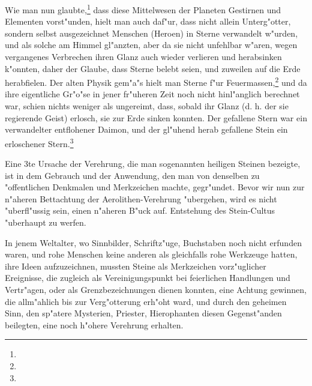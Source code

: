 \documentclass[a4paper, 11pt, oneside, polutonikogreek, german]{article}
\begin{document}
Wie man nun glaubte,\footnote{} dass diese Mittelwesen der Planeten Gestirnen und Elementen vorst"unden, hielt man auch daf"ur, dass nicht allein Unterg"otter, sondern selbst ausgezeichnet Menschen (Heroen) in Sterne verwandelt w"urden, und als solche am Himmel gl"anzten, aber da sie nicht unfehlbar w"aren, wegen vergangenes Verbrechen ihren Glanz auch wieder verlieren und herabsinken k"onnten, daher der Glaube, dass Sterne belebt seien, und zuweilen auf die Erde herabfielen. Der alten Physik gem"a"s hielt man Sterne f"ur Feuermassen,\footnote{} und da ihre eigentliche Gr"o"se in jener fr"uheren Zeit noch nicht hinl"anglich berechnet war, schien nichts weniger als ungereimt, dass, sobald ihr Glanz (d. h. der sie regierende Geist) erlosch, sie zur Erde sinken konnten. Der gefallene Stern war ein verwandelter entflohener Daimon, und der gl"uhend herab gefallene Stein ein erloschener Stern.\footnote{}

Eine 3te Ursache der Verehrung, die man sogenannten heiligen Steinen bezeigte, ist in dem Gebrauch und der Anwendung, den man von denselben zu "offentlichen Denkmalen und Merkzeichen machte, gegr"undet. Bevor wir nun zur n"aheren Bettachtung der Aerolithen-Verehrung "ubergehen, wird es nicht "uberfl"ussig sein, einen n"aheren B"uck auf. Entstehung des Stein-Cultus "uberhaupt zu werfen.

In jenem Weltalter, wo Sinnbilder, Schriftz"uge, Buchstaben noch nicht erfunden waren, und rohe Menschen keine anderen als gleichfalls rohe Werkzeuge hatten, ihre Ideen aufzuzeichnen, mussten Steine als Merkzeichen vorz"uglicher Ereignisse, die zugleich als Vereinigungspunkt bei feierlichen Handlungen und Vertr"agen, oder als Grenzbezeichnungen dienen konnten, eine Achtung gewinnen, die allm"ahlich bis zur Verg"otterung erh"oht ward, und durch den geheimen Sinn, den sp"atere Mysterien, Priester, Hierophanten diesen Gegenst"anden beilegten, eine noch h"ohere Verehrung erhalten.
\end{document}
